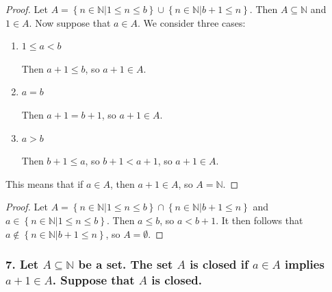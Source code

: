 \documentclass{article}
\newcommand{\N}{\mathbb{N}}
\begin{document}
\begin{proof}
	Let $A = \left\{n \in \N|1 \le n \le b\right\} \cup \left\{n \in \N | b + 1 \le n\right\}$. Then $A \subseteq \N$ and $1 \in A$. Now suppose that $a \in A$. We consider three cases:

	\begin{enumerate}
		\item[Case 1:] $1 \le a < b$
		
		Then $a + 1 \le b$, so $a + 1 \in A$.

		\item[Case 2:] $a = b$
		
		Then $a + 1 = b + 1$, so $a + 1 \in A$.

		\item[Case 3:] $a > b$
		
		Then $b + 1 \le a$, so $b + 1 < a + 1$, so $a + 1 \in A$.
	\end{enumerate}
	This means that if $a \in A$, then $a + 1 \in A$, so $A = \N$.
\end{proof}

\begin{proof}
	Let $A = \left\{n \in \N | 1 \le n \le b\right\} \cap \left\{n \in \N | b+1 \le n\right\}$ and $a \in \left\{n \in \N | 1 \le n \le b\right\}$. Then $a \le b$, so $a < b + 1$. It then follows that $a \notin \left\{n \in \N | b+1 \le n\right\}$, so $A = \emptyset$.
\end{proof}

\subsubsection*{7. Let $A \subseteq \N$ be a set. The set $A$ is closed if $a \in A$ implies $a + 1 \in A$. Suppose that $A$ is closed.}
\end{document}
